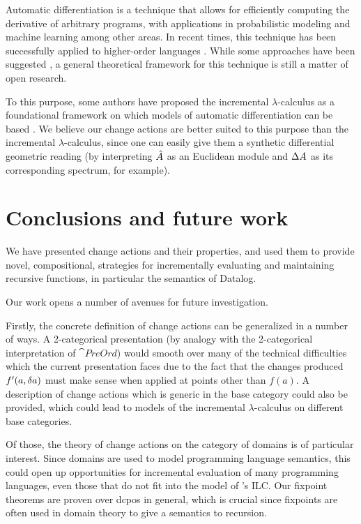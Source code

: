 Automatic differentiation \autocite{griewank2008evaluating} is a technique that allows
for efficiently computing the derivative of arbitrary programs, with
applications in probabilistic modeling \autocite{kucukelbir2017automatic}
and machine learning \autocite{baydin2014automatic} among other areas. In recent times, this technique has been successfully
applied to higher-order languages \autocites{siskind2008nesting}{baydin2016diffsharp}.
While some approaches have been suggested \autocites{manzyuk2012simply}{kelly2016evolving}, a general
theoretical framework for this technique is still a matter of open research. 

To this purpose, some authors have proposed the incremental $\lambda$-calculus
as a foundational framework on which models of automatic differentiation can
be based \autocite{kelly2016evolving}. We believe our change actions are better suited
to this purpose than the incremental $\lambda$-calculus, since one can easily give them a
synthetic differential geometric reading (by interpreting $\hat{A}$ as an Euclidean module and $\Delta A$
as its corresponding spectrum, for example).

\section{Conclusions and future work}

We have presented change actions and their properties, and used them to provide
novel, compositional, strategies for incrementally evaluating and maintaining recursive functions, in
particular the semantics of Datalog.

Our work opens a number of avenues for future investigation.

Firstly, the concrete definition of change actions can be generalized in a number of
ways. A 2-categorical presentation (by analogy with the 2-categorical interpretation
of $\cat{PreOrd}$) would smooth over many of the technical difficulties which
the current presentation faces due to the fact that the changes produced
$f'(a, \delta a)$ must make sense when applied at points other than $f(a)$.
A description of change actions which is generic in
the base category could also be provided, which could lead to models of
the incremental $\lambda$-calculus on different base categories. 

Of those, the theory of change actions on the category of domains is of particular interest. Since
domains are used to model programming language semantics, this could
open up opportunities for incremental evaluation of many programming languages,
even those that do not fit into the model of \citeauthor{cai2014changes}'s ILC.
Our fixpoint theorems are proven over dcpos in general, which is crucial since
fixpoints are often used in domain theory to give a semantics to recursion.

